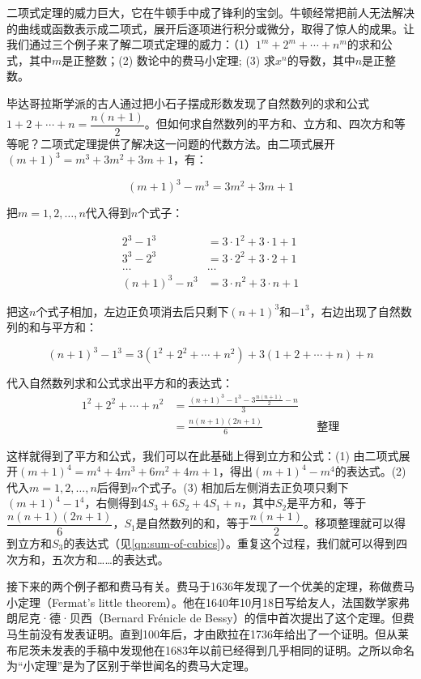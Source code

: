\documentclass[b5paper]{ctexart}
\begin{document}
二项式定理的威力巨大，它在牛顿手中成了锋利的宝剑。牛顿经常把前人无法解决的曲线或函数表示成二项式，展开后逐项进行积分或微分，取得了惊人的成果。让我们通过三个例子来了解二项式定理的威力：（1）$1^m + 2^m + \dotsb  + n^m$的求和公式，其中$m$是正整数；(2) 数论中的费马小定理; (3) 求$x^n$的导数，其中$n$是正整数。

毕达哥拉斯学派的古人通过把小石子摆成形数发现了自然数列的求和公式$1 + 2 + \dotsb + n = \dfrac{n(n+1)}{2}$。但如何求自然数列的平方和、立方和、四次方和等等呢？二项式定理提供了解决这一问题的代数方法。由二项式展开$(m + 1)^3 = m^3 + 3m^2 + 3m + 1$，有：

\[
(m + 1)^3 - m^3 = 3m^2 + 3m + 1
\]

把$m = 1, 2, \dotsc, n$代入得到$n$个式子：

\begin{align*}
2^3 - 1^3 &= 3\cdot1^2 + 3\cdot1 + 1 \\
3^3 - 2^3 &= 3\cdot2^2 + 3\cdot2 + 1 \\
\dotso & \dotso \\
(n+1)^3 - n^3 &= 3\cdot n^2 + 3\cdot n + 1
\end{align*}

把这$n$个式子相加，左边正负项消去后只剩下$(n+1)^3$和$-1^3$，右边出现了自然数列的和与平方和：

\[
(n+1)^3 - 1^3 = 3(1^2 + 2^2 + \dotsb + n^2) + 3(1 + 2 + \dotsb + n) + n
\]

代入自然数列求和公式求出平方和的表达式：
\begin{align*}
1^2 + 2^2 + \dotsb + n^2 &= \frac{(n+1)^3 - 1^3 - 3\frac{n(n+1)}{2} - n}{3} \\
 &= \frac{n(n+1)(2n+1)}{6} && \text{整理}
\end{align*}

这样就得到了平方和公式，我们可以在此基础上得到立方和公式：(1) 由二项式展开$(m + 1)^4 = m^4 + 4m^3 + 6m^2 + 4m + 1$，得出$(m + 1)^4 - m^4$的表达式。(2) 代入$m = 1, 2, \dotsc, n$后得到$n$个式子。(3) 相加后左侧消去正负项只剩下$(m + 1)^4 - 1^4$，右侧得到$4S_3 + 6S_2 + 4S_1 + n$，其中$S_2$是平方和，等于$\dfrac{n(n+1)(2n+1)}{6}$，$S_1$是自然数列的和，等于$\dfrac{n(n+1)}{2}$。移项整理就可以得到立方和$S_3$的表达式（见\cref{qn:sum-of-cubics}）。重复这个过程，我们就可以得到四次方和，五次方和……的表达式。

接下来的两个例子都和费马有关。费马于1636年发现了一个优美的定理，称做费马小定理（Fermat's little theorem）。他在1640年10月18日写给友人，法国数学家弗朗尼克·德·贝西（Bernard Frénicle de Bessy）的信中首次提出了这个定理。但费马生前没有发表证明。直到100年后，才由欧拉在1736年给出了一个证明。但从莱布尼茨未发表的手稿中发现他在1683年以前已经得到几乎相同的证明。之所以命名为“小定理”是为了区别于举世闻名的费马大定理。
\end{document}
